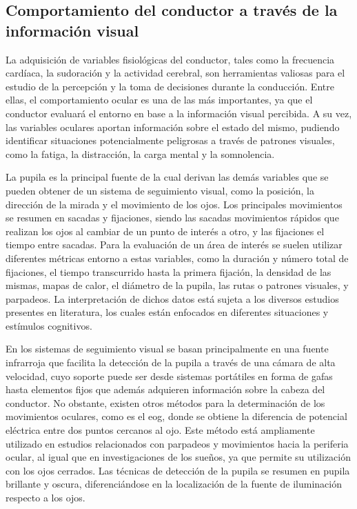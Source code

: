 \subsection{Comportamiento del conductor a través de la información visual}

La adquisición de variables fisiológicas del conductor, tales como la frecuencia cardíaca, la sudoración y la actividad cerebral, son herramientas valiosas para el estudio de la percepción y la toma de decisiones durante la conducción. Entre ellas, el comportamiento ocular es una de las más importantes, ya que el conductor evaluará el entorno en base a la información visual percibida. A su vez, las variables oculares aportan información sobre el estado del mismo, pudiendo identificar situaciones potencialmente peligrosas a través de patrones visuales, como la fatiga, la distracción, la carga mental y la somnolencia. 

La pupila es la principal fuente de la cual derivan las demás variables que se pueden obtener de un sistema de seguimiento visual, como la posición, la dirección de la mirada y el movimiento de los ojos. Los principales movimientos se resumen en sacadas y fijaciones, siendo las sacadas movimientos rápidos que realizan los ojos al cambiar de un punto de interés a otro, y las fijaciones el tiempo entre sacadas. Para la evaluación de un área de interés se suelen utilizar diferentes métricas entorno a estas variables, como la duración y número total de fijaciones, el tiempo transcurrido hasta la primera fijación, la densidad de las mismas, mapas de calor, el diámetro de la pupila, las rutas o patrones visuales, y parpadeos. La interpretación de dichos datos está sujeta a los diversos estudios presentes en literatura, los cuales están enfocados en diferentes situaciones y estímulos cognitivos.

En los sistemas de seguimiento visual se basan principalmente en una fuente infrarroja que facilita la detección de la pupila a través de una cámara de alta velocidad, cuyo soporte puede ser desde sistemas portátiles en forma de gafas hasta elementos fijos que además adquieren información sobre la cabeza del conductor. No obstante, existen otros métodos para la determinación de los movimientos oculares, como es el \gls{eog}, donde se obtiene la diferencia de potencial eléctrica entre dos puntos cercanos al ojo. Este método está ampliamente utilizado en estudios relacionados con parpadeos y movimientos hacia la periferia ocular, al igual que en investigaciones de los sueños, ya que permite su utilización con los ojos cerrados. Las técnicas de detección de la pupila se resumen en pupila brillante y oscura, diferenciándose en la localización de la fuente de iluminación respecto a los ojos.

